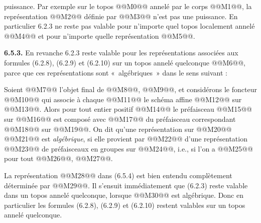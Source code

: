 
puissance. Par exemple sur le topos @@M0@@ annelé par le corps @@M1@@, la représentation @@M2@@ définie par
@@M3@@
n'est pas une puissance. En particulier 6.2.3 ne reste pas valable pour n'importe quel topos localement annelé @@M4@@ et pour n'importe quelle représentation @@M5@@.

\textbf{6.5.3.} En revanche 6.2.3 reste valable pour les représentations associées aux formules (6.2.8), (6.2.9) et (6.2.10) sur un topos annelé quelconque @@M6@@, parce que ces représentations sont «~algébriques~» dans le sens suivant :

Soient @@M7@@ l'objet final de @@M8@@, @@M9@@, et considérons le foncteur
@@M10@@
qui associe à chaque @@M11@@ le schéma affine @@M12@@ sur @@M13@@. Alors pour tout entier positif @@M14@@ le préfaisceau @@M15@@ sur @@M16@@ est composé avec @@M17@@ du préfaisceau correspondant @@M18@@ sur @@M19@@. On dit qu'une représentation sur @@M20@@
@@M21@@
est \emph{algébrique}, si elle provient par @@M22@@ d'une représentation
@@M23@@
de préfaisceaux en groupes sur @@M24@@, i.e., si l'on a
@@M25@@
pour tout @@M26@@, @@M27@@.

La représentation @@M28@@ dans (6.5.4) est bien entendu complètement déterminée par @@M29@@. Il s'ensuit immédiatement que (6.2.3) reste valable dans un topos annelé quelconque, lorsque @@M30@@ est algébrique. Donc en particulier les formules (6.2.8), (6.2.9) et (6.2.10) restent valables sur un topos annelé quelconque.

